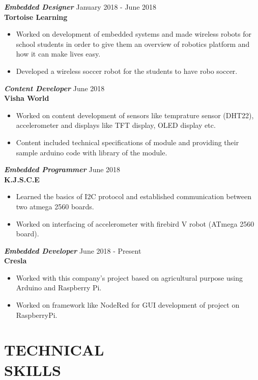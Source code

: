 \documentclass[margin, 11pt]{res} %
\begin{document}
\begin{resume}
{\sl \textbf{Embedded Designer}} \hfill January 2018 - June 2018 \\
\textbf{Tortoise Learning} \\
\begin{itemize}
	\item Worked on development of embedded systems and made wireless robots for
	school students in order to give them an overview of robotics platform and how it
	can make lives easy.
	\item Developed a wireless soccer robot for the students to have robo soccer.
\end{itemize}

{\sl \textbf{Content Developer}} \hfill June 2018 \\
\textbf{Visha World} \\
\begin{itemize}
	\item Worked on content development of sensors like temprature sensor (DHT22), accelerometer and displays like TFT display, OLED display etc.
	\item Content included technical specifications of module and providing their sample arduino code with library of the module.
\end{itemize}

{\sl \textbf{Embedded Programmer}} \hfill June 2018 \\
\textbf{K.J.S.C.E} \\
\begin{itemize}
	\item Learned the basics of I2C protocol and established communication between two atmega 2560 boards. 
	\item Worked on interfacing of accelerometer with firebird V robot (ATmega 2560 board).
\end{itemize}

{\sl \textbf{Embedded Developer}} \hfill June 2018 - Present \\
\textbf{Cresla}\\
\begin{itemize}
	\item Worked with this company’s project based on agricultural purpose using Arduino
	and Raspberry Pi.
	\item Worked on framework like NodeRed for GUI development of project on RaspberryPi.
\end{itemize}


\vspace{.15in}
\section{TECHNICAL \\ SKILLS}


\end{resume}
\end{document}
